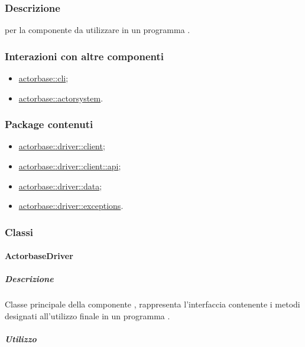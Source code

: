 \documentclass{scalatekids-article}
\begin{document}
\subsubsection{Descrizione}

 per la componente  da utilizzare in un programma
.

\subsubsection{Interazioni con altre componenti}

\begin{itemize}
\item \hyperref[sec:actorbase::cli]{actorbase::cli};
\item \hyperref[sec:actorbase::actorsystem]{actorbase::actorsystem}.
\end{itemize}

\subsubsection{Package contenuti}

\begin{itemize}
\item \hyperref[sec:actorbase::driver::client]{actorbase::driver::client};
\item \hyperref[sec:actorbase::driver::client::api]{actorbase::driver::client::api};
\item \hyperref[sec:actorbase::driver::data]{actorbase::driver::data};
\item \hyperref[sec:actorbase::driver::exceptions]{actorbase::driver::exceptions}.
\end{itemize}

\subsubsection{Classi}

\paragraph{ActorbaseDriver}
\label{sec:actorbase::driver::ActorbaseDriver}

\subparagraph{Descrizione}

Classe principale della componente , rappresenta l'interfaccia
contenente i metodi designati all'utilizzo finale in un programma .

\subparagraph{Utilizzo}
\end{document}
